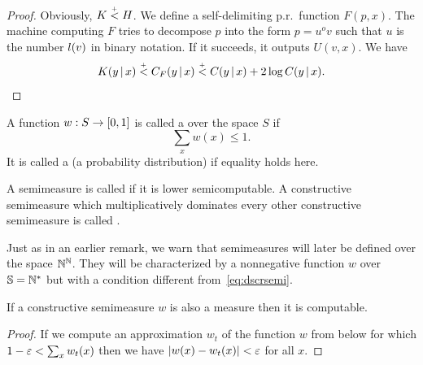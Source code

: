 \begin{proof}
  \leanok
   Obviously, \( K \stackrel{{}_+}{<} H \). We define a self-delimiting
p.r.~function \( F(p,x) \). 
The machine computing \( F \) tries to decompose 
\( p \) into the form \( p=u^o v \) such that \( u \) is the number \( l(v) \) in binary
notation. 
If it succeeds, it outputs \( U(v,x) \). 
We have 
 \[ 
K(y \,\vert\, x) \stackrel{{}_+}{<} C_{F}(y \,\vert\, x) \stackrel{{}_+}{<} C(y \,\vert\, x) + 2\log C(y \,\vert\, x).
 \]
 \end{proof}

  \begin{definition}
  \label{def:semimeasure}
  \leanok
A function \( w : S \to [0,1] \) is called a 
over the space \( S \) if 
 \setcounter{equation}{4}%
 \begin{equation} \label{eq:dscrsemi} 
  \sum_{x} w(x) \le 1. 
 \end{equation}
 It is called a  (a probability distribution) if
equality holds here. 

A semimeasure is called  if it
is lower semicomputable. 
A constructive semimeasure which
multiplicatively dominates every other constructive semimeasure is
called .
  \end{definition}

 \begin{remark}
  \label{rem:semimeasure-later}
Just as in an earlier remark, we warn that semimeasures will later be
defined over the space \( \mathbb{N}^{\mathbb{N}} \). 
They will be characterized by a
nonnegative function \( w \) over \( \mathbb{S}=\mathbb{N}^{*} \) but with a condition different
from~\eqref{eq:dscrsemi}.
 \end{remark}

 \begin{proposition}
  \label{prop:constructive-measure}
  \leanok
If a constructive semimeasure \( w \) is also a measure then it is
computable. 
 \end{proposition}

 \begin{proof}
  \leanok
If we compute an approximation \( w_{t} \) of the
function \( w \) from below for which \( 1-\varepsilon < \sum_{x} w_{t}(x) \) then we
have \( | w(x)-w_{t}(x) | < \varepsilon \) for all \( x \). 
 \end{proof}

